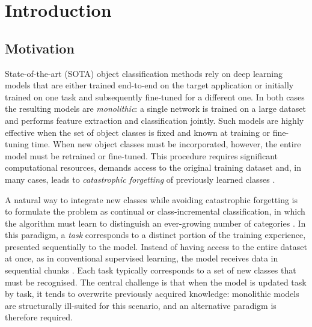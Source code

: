 \chapter{Introduction}
\label{ch:intro}

\section{Motivation}

State-of-the-art (SOTA) object classification methods rely on deep learning models that are either trained end-to-end on the target application or initially trained on one task and subsequently fine-tuned for a different one. In both cases the resulting models are \emph{monolithic}: a single network is trained on a large dataset and performs feature extraction and classification jointly. Such models are highly effective when the set of object classes is fixed and known at training or fine-tuning time. When new object classes must be incorporated, however, the entire model must be retrained or fine-tuned. This procedure requires significant computational resources, demands access to the original training dataset and, in many cases, leads to \emph{catastrophic forgetting} of previously learned classes \cite{catastrophic}.

A natural way to integrate new classes while avoiding catastrophic forgetting is to formulate the problem as continual or class-incremental classification, in which the algorithm must learn to distinguish an ever-growing number of categories \cite{vandeVen}. In this paradigm, a \emph{task} corresponds to a distinct portion of the training experience, presented sequentially to the model. Instead of having access to the entire dataset at once, as in conventional supervised learning, the model receives data in sequential chunks \cite{taskarithmeticloracontinual}. Each task typically corresponds to a set of new classes that must be recognised. The central challenge is that when the model is updated task by task, it tends to overwrite previously acquired knowledge: monolithic models are structurally ill-suited for this scenario, and an alternative paradigm is therefore required.

